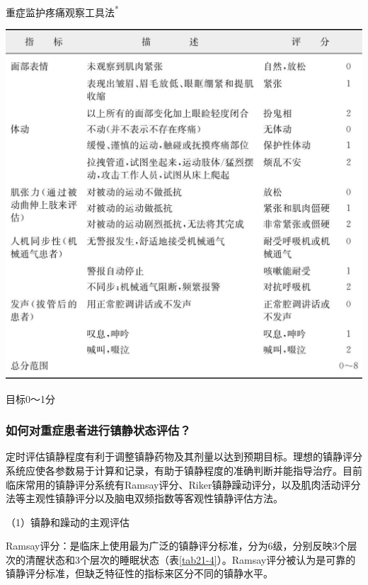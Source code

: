 \begin{table}[htbp]
{\begin{center}
\caption{重症监护疼痛观察工具法\textsuperscript{*}}
\label{tab21-3}
\includegraphics[width=\textwidth,height=\textheight,keepaspectratio]{./images/Image00231.jpg}
\end{center}
}

\footnotesize * 目标0～1分
\end{table}



\subsubsection{如何对重症患者进行镇静状态评估？}

定时评估镇静程度有利于调整镇静药物及其剂量以达到预期目标。理想的镇静评分系统应使各参数易于计算和记录，有助于镇静程度的准确判断并能指导治疗。目前临床常用的镇静评分系统有Ramsay评分、Riker镇静躁动评分，以及肌肉活动评分法等主观性镇静评分以及脑电双频指数等客观性镇静评估方法。

（1）镇静和躁动的主观评估

Ramsay评分：是临床上使用最为广泛的镇静评分标准，分为6级，分别反映3个层次的清醒状态和3个层次的睡眠状态（表\ref{tab21-4}）。Ramsay评分被认为是可靠的镇静评分标准，但缺乏特征性的指标来区分不同的镇静水平。

